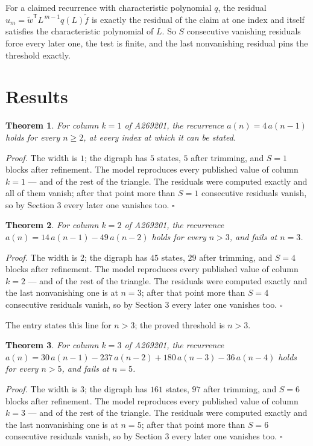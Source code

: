 \documentclass[11pt]{article}
\newtheorem{theorem}{Theorem}
\theoremstyle{definition}
\begin{document}
For a claimed recurrence with characteristic polynomial $q$, the residual $u_m = \tilde w^{\mathsf T}L^{\,m-1}q(L)\tilde f$ is exactly the residual of the claim at one index and itself satisfies the characteristic polynomial of $L$. So $S$ consecutive vanishing residuals force every later one, the test is finite, and the last nonvanishing residual pins the threshold exactly.

\section{Results}

\begin{theorem} For column $k = 1$ of A269201, the recurrence $a(n) = 4\,a(n-1)$ holds for every $n \ge 2$, at every index at which it can be stated.\end{theorem}

{\itshape Proof.} The width is $1$; the digraph has $5$ states, $5$ after trimming, and $S = 1$ blocks after refinement. The model reproduces every published value of column $k = 1$ --- and of the rest of the triangle. The residuals were computed exactly and all of them vanish; after that point more than $S = 1$ consecutive residuals vanish, so by Section 3 every later one vanishes too. $\square$

\begin{theorem} For column $k = 2$ of A269201, the recurrence $a(n) = 14\,a(n-1) - 49\,a(n-2)$ holds for every $n > 3$, and fails at $n = 3$.\end{theorem}

{\itshape Proof.} The width is $2$; the digraph has $45$ states, $29$ after trimming, and $S = 4$ blocks after refinement. The model reproduces every published value of column $k = 2$ --- and of the rest of the triangle. The residuals were computed exactly and the last nonvanishing one is at $n = 3$; after that point more than $S = 4$ consecutive residuals vanish, so by Section 3 every later one vanishes too. $\square$

The entry states this line for $n > 3$; the proved threshold is $n > 3$.

\begin{theorem} For column $k = 3$ of A269201, the recurrence $a(n) = 30\,a(n-1) - 237\,a(n-2) + 180\,a(n-3) - 36\,a(n-4)$ holds for every $n > 5$, and fails at $n = 5$.\end{theorem}

{\itshape Proof.} The width is $3$; the digraph has $161$ states, $97$ after trimming, and $S = 6$ blocks after refinement. The model reproduces every published value of column $k = 3$ --- and of the rest of the triangle. The residuals were computed exactly and the last nonvanishing one is at $n = 5$; after that point more than $S = 6$ consecutive residuals vanish, so by Section 3 every later one vanishes too. $\square$
\end{document}
